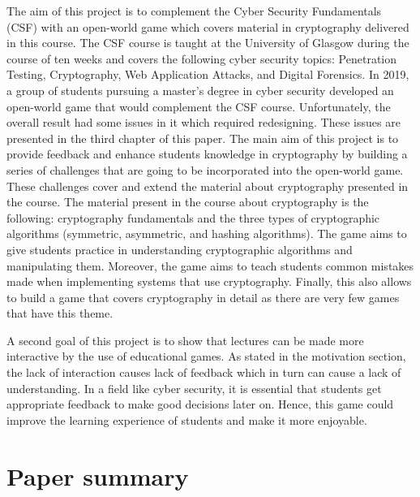 \documentclass{l4proj}
\begin{document}
The aim of this project is to complement the Cyber Security Fundamentals (CSF) with an open-world game 
which covers material in cryptography delivered in this course.
The CSF course is taught at the University of Glasgow during the course of ten weeks and covers the following cyber security topics:
Penetration Testing, Cryptography, Web Application Attacks, and Digital Forensics.
In 2019, a group of students pursuing a master's degree in cyber security developed an open-world game 
that would complement the CSF course. 
Unfortunately, the overall result had some issues in it which required redesigning. %
These issues are presented in the third chapter of this paper.
The main aim of this project is to provide feedback and enhance students knowledge in cryptography
by building a series of challenges that are going to be incorporated into the open-world game. 
These challenges cover and extend the material about cryptography presented in the course.
The material present in the course about cryptography is the following: cryptography fundamentals 
and the three types of cryptographic algorithms (symmetric, asymmetric, and hashing algorithms).
The game aims to give students practice in understanding cryptographic algorithms and manipulating them.
Moreover, the game aims to teach students common mistakes made when implementing systems that use cryptography.
Finally, this also allows to build a game that covers cryptography in detail as there are very few games that have this theme.

A second goal of this project is to show that lectures can be made more interactive by the use of educational games.
As stated in the motivation section, the lack of interaction causes lack of feedback which in turn can cause a lack of understanding.
In a field like cyber security, it is essential that students get appropriate feedback to make good decisions later on.
Hence, this game could improve the learning experience of students and make it more enjoyable.

\section{Paper summary}
\end{document}

